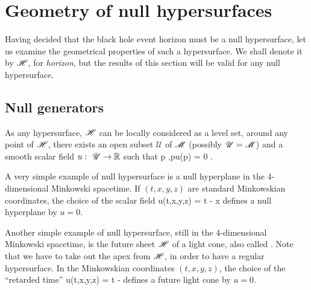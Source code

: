 
\section{Geometry of null hypersurfaces}

Having decided that the black hole event horizon must be a null hypersurface,
let us examine the geometrical properties of such a hypersurface. We shall
denote it by $\mathscr{H}$, for \emph{horizon}, but the results of this section
will be valid for any null hypersurface.

\subsection{Null generators} \label{s:def:null_gener}

As any hypersurface, $\mathscr{H}$ can be locally considered as a level set,
around any point of $\mathscr{H}$, there exists an open subset $\mathscr{U}$
of $\mathscr{M}$ (possibly  $\mathscr{U} = \mathscr{M}$) and
a smooth scalar field $u:\ \mathscr{U} \rightarrow \mathbb{R}$ such that
\be \label{e:def:Hor_u_zero}
    \forall p \in {},\quad p\in \Hor \iff u(p) = 0 .
\ee
\begin{example} \label{x:def:null_hyp}
A very simple example of null hypersurface is a null hyperplane in
the 4-dimensional Minkowski spacetime. If $(t,x,y,z)$ are standard Minkowskian
coordinates, the choice of the scalar field
\be \label{e:def:null_plane_u}
    u(t,x,y,z) = t - x
\ee
defines a null hyperplane by $u=0$.
\end{example}

\begin{example} \label{x:def:light_cone}
Another simple example of null hypersurface, still in the 4-dimensional Minkowski spacetime,
is the future sheet $\mathscr{H}$ of a light cone, also
called . Note that we have
to take out the apex from $\mathscr{H}$, in order to have a regular hypersurface.
In the  Minkowskian coordinates $(t,x,y,z)$, the choice of the
``retarded time''
\be \label{e:def:light_cone_u}
    u(t,x,y,z) = t - 
\ee
defines a future light cone by $u=0$.
\end{example}

